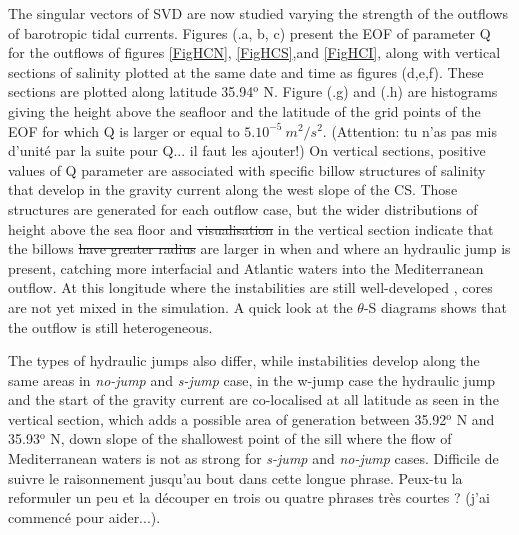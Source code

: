 \color{blue}The singular vectors of SVD are now studied varying the strength of the outflows of barotropic tidal currents. \color{black} Figures (.a, b, c) present the EOF of parameter Q for the outflows of figures \ref{FigHCN}, \ref{FigHCS},and \ref{FigHCI}, along with vertical sections of salinity plotted \color{blue}at the same date and time \color{black} as figures (d,e,f). These sections are plotted along latitude 35.94$^\text{o}$ N. Figure (.g) and (.h) are histograms giving the height above the seafloor and the latitude of the grid points of the EOF for which Q is larger or equal to $5.10^{-5}\ m^2/s^2$. \color{green} (Attention: tu n'as pas mis d'unité par la suite pour Q... il faut les ajouter!) \color{black} On vertical sections, positive values of Q parameter are associated with specific billow structures of salinity that develop in the gravity current along the west slope of the CS. Those structures are generated for each outflow case, but the wider distributions of height above the sea floor and \sout{visualisation} in the vertical section \color{blue}indicate that \color{black} the billows \color{blue}\sout{have greater radius} are larger in \color{black} when and where an hydraulic jump is present, catching more interfacial and Atlantic waters into the Mediterranean outflow. At this longitude where the instabilities are still \color{blue}well-developed \color{black}, cores are not yet mixed in the simulation. A quick look at the $\theta$-S diagrams shows \color{blue} that the outflow is still heterogeneous.

The types \color{blue}of hydraulic jumps \color{black} also differ, while instabilities develop along the same areas in \textit{no-jump} and \textit{s-jump} case, in the w-jump case the hydraulic jump and the start of the gravity current are co-localised at all latitude as seen in the vertical section, which adds a possible area of generation between 35.92$^\text{o}$ N and 35.93$^\text{o}$ N, down slope of the shallowest point of the sill where the flow of Mediterranean waters is not as strong for \textit{s-jump} and \textit{no-jump} cases. \color{green} Difficile de suivre le raisonnement jusqu'au bout dans cette longue phrase. Peux-tu la reformuler un peu et la découper en trois ou quatre phrases très courtes ? (j'ai commencé pour aider...).\color{black}


